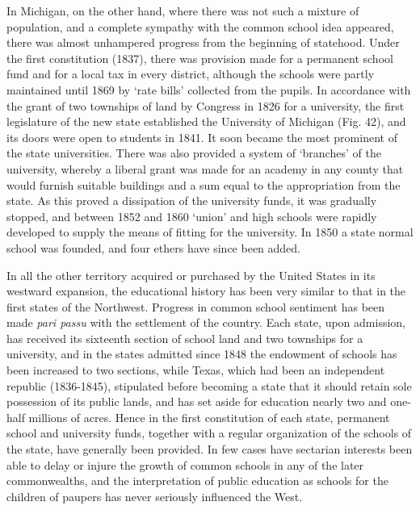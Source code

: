 \documentclass[
]{book}
\begin{document}
In Michigan, on the other hand, where there was not such a mixture of population, and a complete sympathy with the common school idea appeared, there was almost unhampered progress from the beginning of statehood. Under the first constitution (1837), there was provision made for a permanent school fund and for a local tax in every district, although the schools were partly maintained until 1869 by `rate bills' collected from the pupils. In accordance with the grant of two townships of land by Congress in 1826 for a university, the first legislature of the new state established the University of Michigan (Fig. 42), and its doors were open to students in 1841. It soon became the most prominent of the state universities. There was also provided a system of `branches' of the university, whereby a liberal grant was made for an academy in any county that would furnish suitable buildings and a sum equal to the appropriation from the state. As this proved a dissipation of the university funds, it was gradually stopped, and between 1852 and 1860 `union' and high schools were rapidly developed to supply the means of fitting for the university. In 1850 a state normal school was founded, and four ethers have since been added.

In all the other territory acquired or purchased by the United States in its westward expansion, the educational history has been very similar to that in the first states of the Northwest. Progress in common school sentiment has been made \emph{pari passu} with the settlement of the country. Each state, upon admission, has received its sixteenth section of school land and two townships for a university, and in the states admitted since 1848 the endowment of schools has been increased to two sections, while Texas, which had been an independent republic (1836-1845), stipulated before becoming a state that it should retain sole possession of its public lands, and has set aside for education nearly two and one-half millions of acres. Hence in the first constitution of each state, permanent school and university funds, together with a regular organization of the schools of the state, have generally been provided. In few cases have sectarian interests been able to delay or injure the growth of common schools in any of the later commonwealths, and the interpretation of public education as schools for the children of paupers has never seriously influenced the West.
\end{document}
